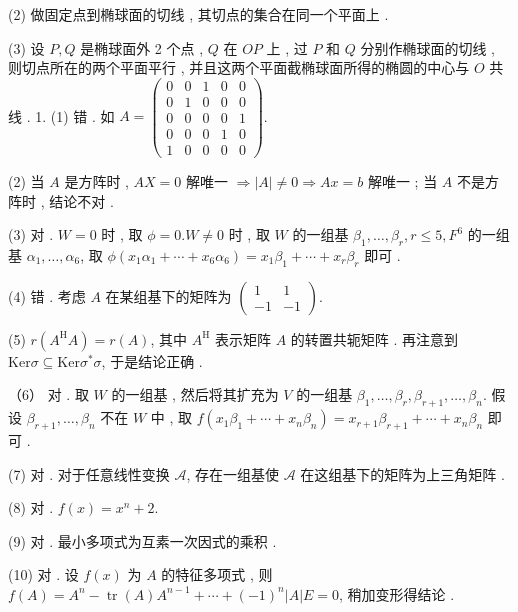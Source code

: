 \documentclass[10pt]{article}
\begin{document}
(2)  做固定点到椭球面的切线 ,  其切点的集合在同一个平面上 .

(3)  设  $P, Q$  是椭球面外  2  个点 , $Q$  在  $O P$  上 ,  过  $P$  和  $Q$  分别作椭球面的切线 ,  则切点所在的两个平面平行 ,  并且这两个平面截椭球面所得的椭圆的中心与  $O$  共线 . 1. (1)  错 .  如  $A=\left(\begin{array}{lllll}0 & 0 & 1 & 0 & 0 \\ 0 & 1 & 0 & 0 & 0 \\ 0 & 0 & 0 & 0 & 1 \\ 0 & 0 & 0 & 1 & 0 \\ 1 & 0 & 0 & 0 & 0\end{array}\right)$.

(2)  当  $A$  是方阵时 , $A X=0$  解唯一  $\Longrightarrow|A| \neq 0 \Longrightarrow A x=b$  解唯一 ;  当  $A$  不是方阵时 ,  结论不对 .

(3)  对 . $W=0$  时 ,  取  $\phi=0 . W \neq 0$  时 ,  取  $W$  的一组基  $\beta_{1}, \ldots, \beta_{r}, r \leq 5, F^{6}$  的一组基  $\alpha_{1}, \ldots, \alpha_{6}$,  取  $\phi\left(x_{1} \alpha_{1}+\cdots+x_{6} \alpha_{6}\right)=x_{1} \beta_{1}+\cdots+x_{r} \beta_{r}$  即可 .

(4)  错 .  考虑  $A$  在某组基下的矩阵为  $\left(\begin{array}{rr}1 & 1 \\ -1 & -1\end{array}\right)$.

(5) $r\left(A^{\mathrm{H}} A\right)=r(A)$,  其中  $A^{\mathrm{H}}$  表示矩阵  $A$  的转置共轭矩阵 .  再注意到  $\mathrm{Ker} \sigma \subseteq \mathrm{Ker} \sigma^{*} \sigma$,  于是结论正确 .

（6） 对 .  取  $W$  的一组基 ,  然后将其扩充为  $V$  的一组基  $\beta_{1}, \ldots, \beta_{r}, \beta_{r+1}, \ldots, \beta_{n}$.  假设  $\beta_{r+1}, \ldots, \beta_{n}$  不在  $W$  中 ,  取  $f\left(x_{1} \beta_{1}+\cdots+x_{n} \beta_{n}\right)=x_{r+1} \beta_{r+1}+\cdots+x_{n} \beta_{n}$  即可 .

(7)  对 .  对于任意线性变换  $\mathcal{A}$,  存在一组基使  $\mathcal{A}$  在这组基下的矩阵为上三角矩阵 .

(8)  对 . $f(x)=x^{n}+2$.

(9)  对 . 最小多项式为互素一次因式的乘积 .

(10)  对 .  设  $f(x)$  为  $A$  的特征多项式 ,  则  $f(A)=A^{n}-\operatorname{tr}(A) A^{n-1}+\cdots+(-1)^{n}|A| E=0$,  稍加变形得结论 .
\end{document}
